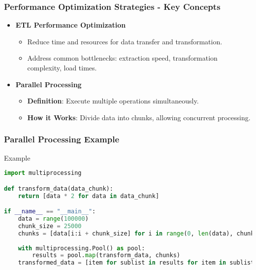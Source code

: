 \documentclass[aspectratio=169]{beamer}
\begin{document}
\begin{frame}[fragile]
    \frametitle{Performance Optimization Strategies - Key Concepts}
    \begin{itemize}
        \item \textbf{ETL Performance Optimization}
        \begin{itemize}
            \item Reduce time and resources for data transfer and transformation.
            \item Address common bottlenecks: extraction speed, transformation complexity, load times.
        \end{itemize}
        
        \item \textbf{Parallel Processing}
        \begin{itemize}
            \item \textbf{Definition}: Execute multiple operations simultaneously.
            \item \textbf{How it Works}: Divide data into chunks, allowing concurrent processing.
        \end{itemize}
    \end{itemize}
\end{frame}

\begin{frame}[fragile]
    \frametitle{Parallel Processing Example}
    \begin{block}{Example}
    \begin{lstlisting}[language=Python]
import multiprocessing

def transform_data(data_chunk):
    return [data * 2 for data in data_chunk]

if __name__ == "__main__":
    data = range(100000)
    chunk_size = 25000
    chunks = [data[i:i + chunk_size] for i in range(0, len(data), chunk_size)]
    
    with multiprocessing.Pool() as pool:
        results = pool.map(transform_data, chunks)
    transformed_data = [item for sublist in results for item in sublist]
    \end{lstlisting}
    \end{block}
\end{frame}
\end{document}
